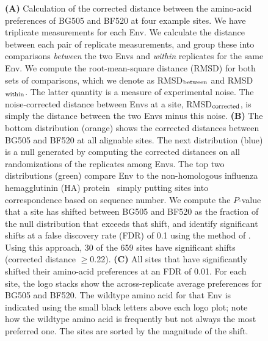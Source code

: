 \documentclass[9pt]{elife}
\begin{document}
\begin{figure}
\begin{fullwidth}
{{\bf (A)} Calculation of the corrected distance between the amino-acid preferences of BG505 and BF520 at four example sites.
We have triplicate measurements for each Env.
We calculate the distance between each pair of replicate measurements, and group these into comparisons \emph{between} the two Envs and \emph{within} replicates for the same Env.
We compute the root-mean-square distance (RMSD) for both sets of comparisons, which we denote as RMSD$_{\rm{between}}$ and RMSD$_{\rm{within}}$.
The latter quantity is a measure of experimental noise.
The noise-corrected distance between Envs at a site, RMSD$_{\rm{corrected}}$, is simply the distance between the two Envs minus this noise.
{\bf (B)} The bottom distribution (orange) shows the corrected distances between BG505 and BF520 at all alignable sites.
The next distribution (blue) is a null generated by computing the corrected distances on all randomizations of the replicates among Envs.
The top two distributions (green) compare Env to the non-homologous influenza hemagglutinin (HA) protein~\citep{doud2016accurate} simply putting sites into correspondence based on sequence number.
We compute the $P$-value that a site has shifted between BG505 and BF520 as the fraction of the null distribution that exceeds that shift, and identify significant shifts at a false discovery rate (FDR) of 0.1 using the method of \citet{benjamini1995controlling}.
Using this approach, 30 of the 659 sites have significant shifts (corrected distance $\ge$0.22).
{\bf (C)} All sites that have significantly shifted their amino-acid preferences at an FDR of 0.01.
For each site, the logo stacks show the across-replicate average preferences for BG505 and BF520.
The wildtype amino acid for that Env is indicated using the small black letters above each logo plot; note how the wildtype amino acid is frequently but not always the most preferred one.
The sites are sorted by the magnitude of the shift.
}
\end{fullwidth}
\end{figure}
\end{document}
